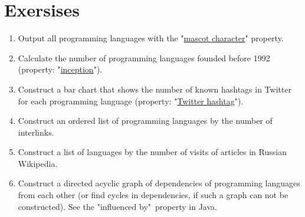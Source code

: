 \section{Exersises}
\begin{enumerate}
\item Output all programming languages with the "\href{https://www.wikidata.org/wiki/Property:P822}{mascot character}" property.
\item Calculate the number of programming languages founded before 1992 (property: "\href{https://www.wikidata.org/wiki/Property:P571}{inception}").
\item Construct a bar chart that shows the number of known hashtags in Twitter for each programming language (property: "\href{https://www.wikidata.org/wiki/Property:P2572}{Twitter hashtag}").
\item Construct an ordered list of programming languages by the number of interlinks.
\item Construct a list of languages by the number of visits of articles in Russian Wikipedia.
\item Construct a directed acyclic graph of dependencies of programming languages from each other (or find cycles in dependencies, if such a graph can not be constructed). See the "influenced by"\  property in Java.
\end{enumerate}
